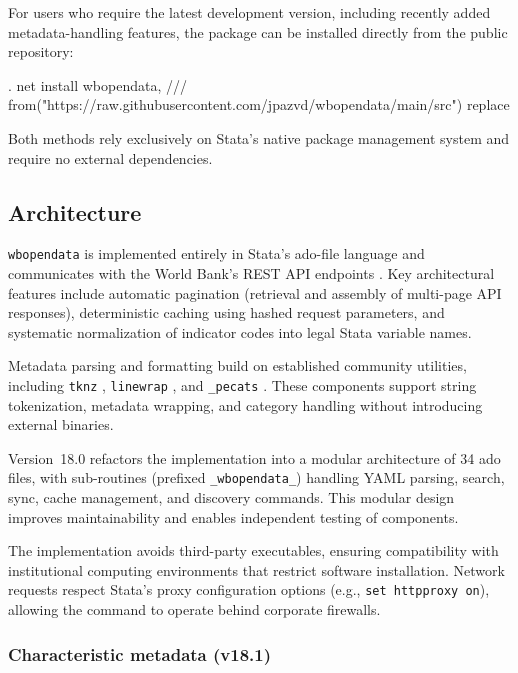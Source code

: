 \documentclass[bib]{statapress}
\begin{document}
For users who require the latest development version, including recently added
metadata-handling features, the package can be installed directly from the
public repository:

\begin{stlog}
. net install wbopendata, ///
  from("https://raw.githubusercontent.com/jpazvd/wbopendata/main/src") replace
\nullskip
\end{stlog}

Both methods rely exclusively on Stata’s native package management system and
require no external dependencies.

\subsection{Architecture}

\texttt{wbopendata} is implemented entirely in Stata’s ado-file language and
communicates with the World Bank’s REST API endpoints \citep{worldbank2024api}.
Key architectural features include automatic pagination (retrieval and assembly
of multi-page API responses), deterministic caching using hashed request
parameters, and systematic normalization of indicator codes into legal Stata
variable names.

Metadata parsing and formatting build on established community utilities,
including \texttt{tknz} \citep{elliott2002tknz}, \texttt{linewrap}
\citep{overazevedo2000linewrap}, and \texttt{\_pecats}
\citep{longfreese2001pecats}. These components support string tokenization,
metadata wrapping, and category handling without introducing external binaries.

Version~18.0 refactors the implementation into a modular architecture of 34 ado
files, with sub-routines (prefixed \texttt{\_wbopendata\_}) handling YAML parsing,
search, sync, cache management, and discovery commands. This modular design
improves maintainability and enables independent testing of components.

The implementation avoids third-party executables, ensuring compatibility with
institutional computing environments that restrict software installation.
Network requests respect Stata's proxy configuration options (e.g.,
\texttt{set httpproxy on}), allowing the command to operate behind corporate
firewalls.

\subsubsection*{Characteristic metadata (v18.1)}
\end{document}
